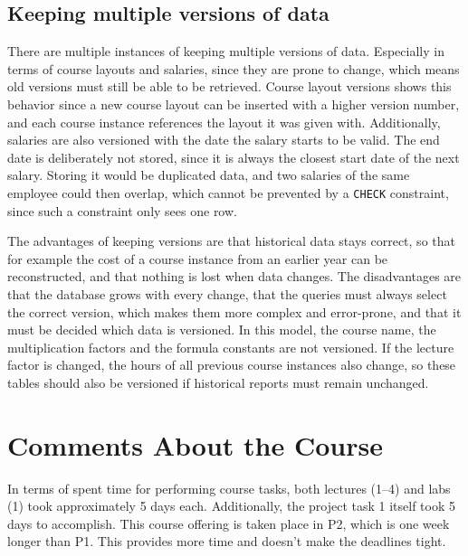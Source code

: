 \documentclass[a4paper]{scrartcl}
\renewcommand{\_}{\textunderscore\allowbreak}
\begin{document}
\subsection{Keeping multiple versions of data}

There are multiple instances of keeping multiple versions of data. Especially in terms of course layouts and salaries, since they are prone to change, which means old versions must still be able to be retrieved. Course layout versions shows this behavior since a new course layout can be inserted with a higher version number, and each course instance references the layout it was given with. Additionally, salaries are also versioned with the date the salary starts to be valid. The end date is deliberately not stored, since it is always the closest start date of the next salary. Storing it would be duplicated data, and two salaries of the same employee could then overlap, which cannot be prevented by a \texttt{CHECK} constraint, since such a constraint only sees one row.

The advantages of keeping versions are that historical data stays correct, so that for example the cost of a course instance from an earlier year can be reconstructed, and that nothing is lost when data changes. The disadvantages are that the database grows with every change, that the queries must always select the correct version, which makes them more complex and error-prone, and that it must be decided which data is versioned. In this model, the course name, the multiplication factors and the formula constants are not versioned. If the lecture factor is changed, the hours of all previous course instances also change, so these tables should also be versioned if historical reports must remain unchanged.

\section{Comments About the Course}



In terms of spent time for performing course tasks, both lectures (1--4) and labs (1) took approximately 5 days each. Additionally, the project task 1 itself took 5 days to accomplish. This course offering is taken place in P2, which is one week longer than P1. This provides more time and doesn't make the deadlines tight.
\end{document}
